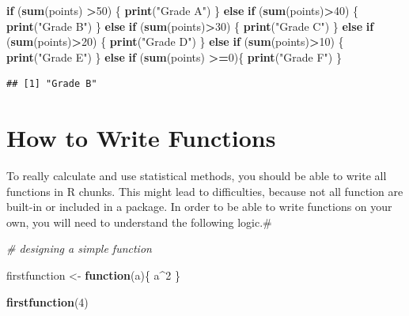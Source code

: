 \documentclass[]{report}
\newenvironment{Shaded}{\begin{snugshade}}{\end{snugshade}}
\newcommand{\KeywordTok}[1]{\textcolor[rgb]{0.13,0.29,0.53}{\textbf{#1}}}
\newcommand{\DecValTok}[1]{\textcolor[rgb]{0.00,0.00,0.81}{#1}}
\newcommand{\StringTok}[1]{\textcolor[rgb]{0.31,0.60,0.02}{#1}}
\newcommand{\CommentTok}[1]{\textcolor[rgb]{0.56,0.35,0.01}{\textit{#1}}}
\newcommand{\ControlFlowTok}[1]{\textcolor[rgb]{0.13,0.29,0.53}{\textbf{#1}}}
\newcommand{\OperatorTok}[1]{\textcolor[rgb]{0.81,0.36,0.00}{\textbf{#1}}}
\newcommand{\NormalTok}[1]{#1}
\begin{document}
\begin{Shaded}
\begin{Highlighting}[]
\ControlFlowTok{if}\NormalTok{ (}\KeywordTok{sum}\NormalTok{(points) }\OperatorTok{>}\DecValTok{50}\NormalTok{) \{}
  \KeywordTok{print}\NormalTok{(}\StringTok{"Grade A"}\NormalTok{)}
\NormalTok{\} }\ControlFlowTok{else} \ControlFlowTok{if}\NormalTok{ (}\KeywordTok{sum}\NormalTok{(points)}\OperatorTok{>}\DecValTok{40}\NormalTok{) \{}
  \KeywordTok{print}\NormalTok{(}\StringTok{"Grade B"}\NormalTok{)}
\NormalTok{\} }\ControlFlowTok{else} \ControlFlowTok{if}\NormalTok{ (}\KeywordTok{sum}\NormalTok{(points)}\OperatorTok{>}\DecValTok{30}\NormalTok{) \{}
  \KeywordTok{print}\NormalTok{(}\StringTok{"Grade C"}\NormalTok{)}
\NormalTok{\} }\ControlFlowTok{else} \ControlFlowTok{if}\NormalTok{ (}\KeywordTok{sum}\NormalTok{(points)}\OperatorTok{>}\DecValTok{20}\NormalTok{) \{}
  \KeywordTok{print}\NormalTok{(}\StringTok{"Grade D"}\NormalTok{)}
\NormalTok{\} }\ControlFlowTok{else} \ControlFlowTok{if}\NormalTok{ (}\KeywordTok{sum}\NormalTok{(points)}\OperatorTok{>}\DecValTok{10}\NormalTok{) \{}
  \KeywordTok{print}\NormalTok{(}\StringTok{"Grade E"}\NormalTok{)  }
\NormalTok{\} }\ControlFlowTok{else} \ControlFlowTok{if}\NormalTok{ (}\KeywordTok{sum}\NormalTok{(points) }\OperatorTok{>=}\DecValTok{0}\NormalTok{)\{}
  \KeywordTok{print}\NormalTok{(}\StringTok{"Grade F"}\NormalTok{)}
\NormalTok{\}}
\end{Highlighting}
\end{Shaded}

\begin{verbatim}
## [1] "Grade B"
\end{verbatim}

\section{How to Write Functions}\label{how-to-write-functions}

To really calculate and use statistical methods, you should be able to
write all functions in R chunks. This might lead to difficulties,
because not all function are built-in or included in a package. In order
to be able to write functions on your own, you will need to understand
the following logic.\#

\begin{Shaded}
\begin{Highlighting}[]
\CommentTok{# designing a simple function}

\NormalTok{firstfunction <-}\StringTok{ }\ControlFlowTok{function}\NormalTok{(a)\{}
\NormalTok{  a}\OperatorTok{^}\DecValTok{2}
\NormalTok{\}}

\KeywordTok{firstfunction}\NormalTok{(}\DecValTok{4}\NormalTok{)}
\end{Highlighting}
\end{Shaded}
\end{document}
